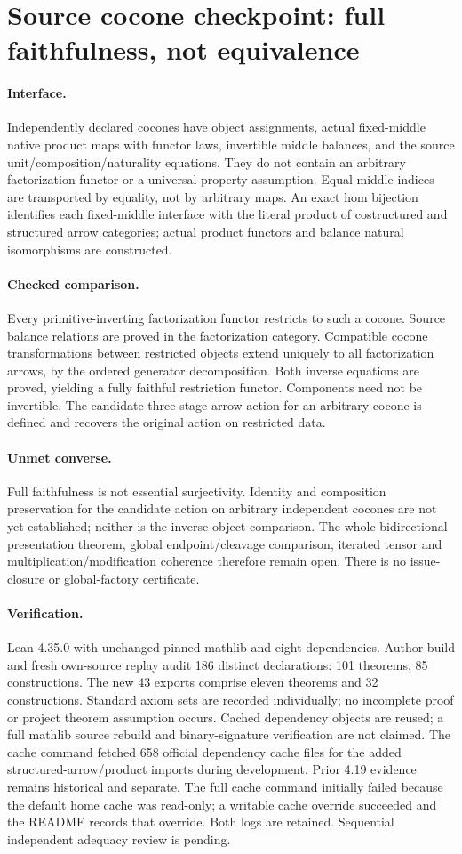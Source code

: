 \documentclass{article}
\begin{document}
\section*{Source cocone checkpoint: full faithfulness, not equivalence}
\paragraph{Interface.} Independently declared cocones have object assignments, actual fixed-middle native product maps with functor laws, invertible middle balances, and the source unit/composition/naturality equations. They do not contain an arbitrary factorization functor or a universal-property assumption. Equal middle indices are transported by equality, not by arbitrary maps. An exact hom bijection identifies each fixed-middle interface with the literal product of costructured and structured arrow categories; actual product functors and balance natural isomorphisms are constructed.
\paragraph{Checked comparison.} Every primitive-inverting factorization functor restricts to such a cocone. Source balance relations are proved in the factorization category. Compatible cocone transformations between restricted objects extend uniquely to all factorization arrows, by the ordered generator decomposition. Both inverse equations are proved, yielding a fully faithful restriction functor. Components need not be invertible. The candidate three-stage arrow action for an arbitrary cocone is defined and recovers the original action on restricted data.
\paragraph{Unmet converse.} Full faithfulness is not essential surjectivity. Identity and composition preservation for the candidate action on arbitrary independent cocones are not yet established; neither is the inverse object comparison. The whole bidirectional presentation theorem, global endpoint/cleavage comparison, iterated tensor and multiplication/modification coherence therefore remain open. There is no issue-closure or global-factory certificate.
\paragraph{Verification.} Lean 4.35.0 with unchanged pinned mathlib and eight dependencies. Author build and fresh own-source replay audit 186 distinct declarations: 101 theorems, 85 constructions. The new 43 exports comprise eleven theorems and 32 constructions. Standard axiom sets are recorded individually; no incomplete proof or project theorem assumption occurs. Cached dependency objects are reused; a full mathlib source rebuild and binary-signature verification are not claimed. The cache command fetched 658 official dependency cache files for the added structured-arrow/product imports during development. Prior 4.19 evidence remains historical and separate. The full cache command initially failed because the default home cache was read-only; a writable cache override succeeded and the README records that override. Both logs are retained. Sequential independent adequacy review is pending.
\end{document}
